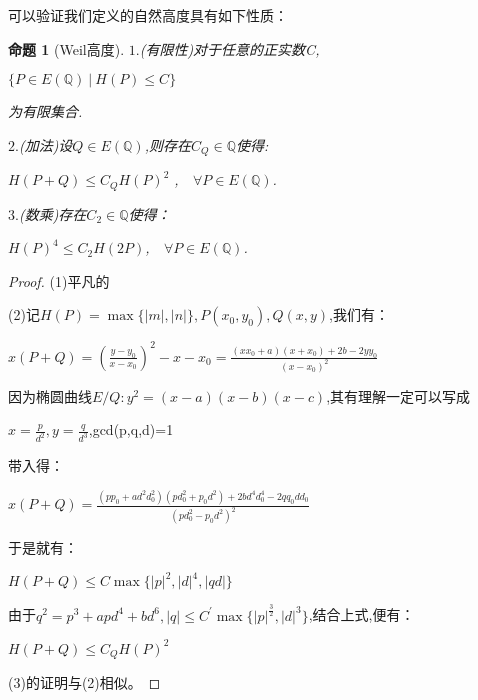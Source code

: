\documentclass[11pt]{ctexart}
\DeclareMathOperator{\Max}{max}
\newtheorem{pro}{命题}[section]
\begin{document}
可以验证我们定义的自然高度具有如下性质：

\begin{pro}[Weil高度]
$1.$(有限性)对于任意的正实数C,
\begin{center}
        $\{P\in E(\mathbb{Q})~|~H(P)\leqslant C\}$
\end{center}
为有限集合.
    
$2.$(加法)设$Q \in E(\mathbb{Q})$,则存在$C_Q\in \mathbb{Q}$使得:

\begin{center}
    $H(P+Q)\leqslant C_QH(P)^2$ ,~~$\forall P \in E(\mathbb{Q})$.
\end{center}

$3.$(数乘)存在$C_2\in \mathbb{Q}$使得：
\begin{center}
    $H(P)^4 \leqslant C_2H(2P)$,~~$\forall P \in E(\mathbb{Q})$.
\end{center}

\end{pro}

\begin{proof}
(1)平凡的

(2)记$H(P)=\Max\{|m|,|n|\},P(x_0,y_0),Q(x,y)$,我们有：
\begin{center}
   $ x(P+Q)=(\frac{y-y_0}{x-x_0})^2 -x-x_0 =\frac{(xx_0+a)(x+x_0)+2b-2yy_0}{(x-x_0)^2} $
\end{center}

\noindent
因为椭圆曲线$E/Q:y^2 = (x-a)(x-b)(x-c)$,其有理解一定可以写成
\begin{center}
    $x=\frac{p}{d^2},y=\frac{q}{d^3}$,gcd(p,q,d)=1
\end{center}
\noindent
带入得：
\begin{center}
    $x(P+Q)=\frac{(pp_0+ad^2d_0^2)(pd_0^2+p_0d^2)+2bd^4d_0^4-2qq_0dd_0}{(pd_0^2-p_0d^2)^2}$
\end{center}

\noindent
于是就有：

\begin{center}
    $H(P+Q)\leqslant C \Max \{|p|^2,|d|^4,|qd|\}$
\end{center}

\noindent
由于$q^2=p^3+apd^4+bd^6,|q|\leqslant C^{\prime}\Max\{|p|^{\frac{3}{2}},|d|^3\}$,结合上式,便有：

\begin{center}
    $H(P+Q)\leqslant C_Q H(P)^2$
\end{center}

(3)的证明与(2)相似。
\end{proof}
\end{document}
